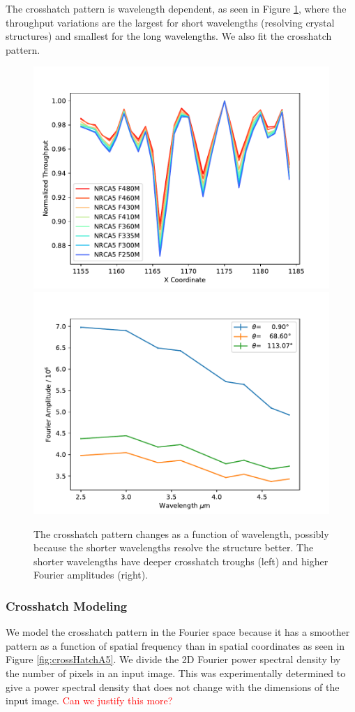 \documentclass{aastex62}
\begin{document}
The crosshatch pattern is wavelength dependent, as seen in Figure \ref{fig:crossHatchWavelengthDep}, where the throughput variations are the largest for short wavelengths (resolving crystal structures) and smallest for the long wavelengths.
We also fit the crosshatch pattern.

\begin{figure}[!hbtp]
\centering
\includegraphics[width=.49\columnwidth]{cross_sec_of_crosshatch.pdf}
\includegraphics[width=.49\columnwidth]{fourier_power_from_fit.pdf}
\caption{
The crosshatch pattern changes as a function of wavelength, possibly because the shorter wavelengths resolve the structure better.
The shorter wavelengths have deeper crosshatch troughs (left) and higher Fourier amplitudes (right).
}\label{fig:crossHatchWavelengthDep}
\end{figure}


\subsubsection{Crosshatch Modeling}
We model the crosshatch pattern in the Fourier space because it has a smoother pattern as a function of spatial frequency than in spatial coordinates as seen in Figure \ref{fig:crossHatchA5}.
We divide the 2D Fourier power spectral density by the number of pixels in an input image.
This was experimentally determined to give a power spectral density that does not change with the dimensions of the input image.
\textcolor{red}{Can we justify this more?}
\end{document}
